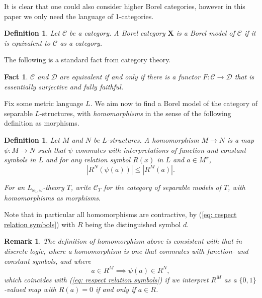 \documentclass[12pt]{amsart}
\newtheorem{fact}[theorem]{Fact}
\newtheorem{definition}[theorem]{Definition}
\newtheorem{remark}[theorem]{Remark}
\begin{document}
It is clear that one could also consider higher Borel categories, however in this paper we only need the language of 1-categories.

\begin{definition}
    Let $\mathcal{C}$ be a category. A Borel category $\mathbf{X}$ is a Borel model of $\mathcal{C}$ if it is equivalent to $\mathcal{C}$ as a category. 
\end{definition}

The following is a standard fact from category theory.

\begin{fact}\label{fact: equivalences of categories}
    $\mathcal{C}$ and $\mathcal{D}$ are equivalent if and only if there is a functor $F \colon \mathcal{C}\to\mathcal{D}$ that is essentially surjective and fully faithful. 
\end{fact}

Fix some metric language $L$. We aim now to find a Borel model of the category of separable $L$-structures, with \emph{homomorphisms} in the sense of the following definition as morphisms.

\begin{definition}\label{definition: homomorphism}
    Let $M$ and $N$ be $L$-structures. A homomorphism $M\to N$ is a map $\psi \colon M\to N$ such that $\psi$ commutes with interpretations of function and constant symbols in $L$
    and for any relation symbol $R(x)$ in $L$ and $a\in M^x$, 
    \begin{equation}\label{eq: respect relation symbols}
        |R^{N}(\psi(a))|\leq |R^{M}(a)|.
    \end{equation} 

    For an $L_{\omega_1,\omega}$-theory $T$, write $\mathcal{C}_T$ for the category of separable models of $T$, with homomorphisms as morphisms.
\end{definition}

Note that in particular all homomorphisms are contractive, by (\ref{eq: respect relation symbols}) with $R$ being the distinguished symbol $d$.

\begin{remark}
    The definition of homomorphism above is consistent with that in discrete logic, where a homomorphism is one that commutes with function- and constant symbols, and where 
    \[a\in R^{M}\implies \psi(a)\in R^N,\]
    which coincides with (\ref{eq: respect relation symbols}) if we interpret $R^M$ as a $\{0,1\}$-valued map with $R(a)=0$ if and only if $a\in R$.
\end{remark}
\end{document}

